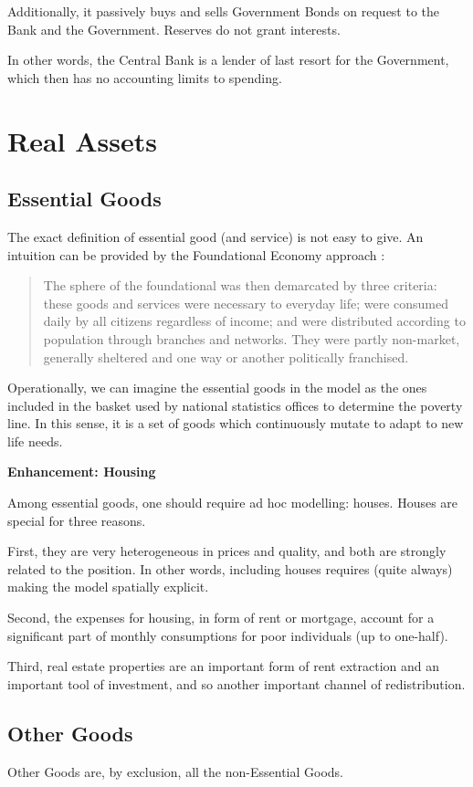 \documentclass[a4paper, headings=standardclasses]{scrartcl}
\newenvironment{enh}[1][]{\begin{framed}\noindent\textbf{Enhancement: #1}\par}{\end{framed}}
\begin{document}
Additionally, it passively buys and sells Government Bonds on request to the Bank and the Government. Reserves do not grant interests.

In other words, the Central Bank is a lender of last resort for the Government, which then has no accounting limits to spending.

\section{Real Assets}
\subsection{Essential Goods}
The exact definition of essential good (and service) is not easy to give. An intuition can be provided by the Foundational Economy approach \parencite{arcidiacono2018}: \begin{quote}
	The sphere of the foundational was then demarcated by three criteria: these goods and services were necessary to everyday life; were consumed daily by all citizens regardless of income; and were distributed according to population through branches and networks. They were partly non-market, generally sheltered and one way or another politically franchised.
\end{quote}

Operationally, we can imagine the essential goods in the model as the ones included in the basket used by national statistics offices to determine the poverty line. In this sense, it is a set of goods which continuously mutate to adapt to new life needs.

\begin{enh}[Housing]
	Among essential goods, one should require ad hoc modelling: houses. Houses are special for three reasons.

	First, they are very heterogeneous in prices and quality, and both are strongly related to the position. In other words, including houses requires (quite always) making the model spatially explicit.

	Second, the expenses for housing, in form of rent or mortgage, account for a significant part of monthly consumptions for poor individuals (up to one-half).

	Third, real estate properties are an important form of rent extraction and an important tool of investment, and so another important channel of redistribution.
\end{enh}

\subsection{Other Goods}
Other Goods are, by exclusion, all the non-Essential Goods.
\end{document}
